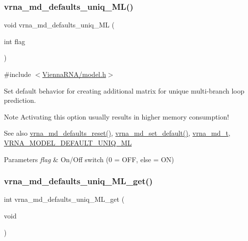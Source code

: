 \subsubsection{\texorpdfstring{vrna\+\_\+md\+\_\+defaults\+\_\+uniq\+\_\+\+M\+L()}{vrna\_md\_defaults\_uniq\_ML()}}
{\footnotesize\ttfamily void vrna\+\_\+md\+\_\+defaults\+\_\+uniq\+\_\+\+ML (\begin{DoxyParamCaption}\item[{int}]{flag }\end{DoxyParamCaption})}



{\ttfamily \#include $<$\hyperlink{model_8h}{Vienna\+R\+N\+A/model.\+h}$>$}



Set default behavior for creating additional matrix for unique multi-\/branch loop prediction. 

\begin{DoxyNote}{Note}
Activating this option usually results in higher memory consumption! 
\end{DoxyNote}
\begin{DoxySeeAlso}{See also}
\hyperlink{group__model__details_ga70834424cf804d149937de89f80ceb45}{vrna\+\_\+md\+\_\+defaults\+\_\+reset()}, \hyperlink{group__model__details_ga8ac6ff84936282436f822644bf841f66}{vrna\+\_\+md\+\_\+set\+\_\+default()}, \hyperlink{group__model__details_ga1f8a10e12a0a1915f2a4eff0b28ea17c}{vrna\+\_\+md\+\_\+t}, \hyperlink{group__model__details_ga63f6006a02ba2d89148441f406c309e7}{V\+R\+N\+A\+\_\+\+M\+O\+D\+E\+L\+\_\+\+D\+E\+F\+A\+U\+L\+T\+\_\+\+U\+N\+I\+Q\+\_\+\+ML} 
\end{DoxySeeAlso}

\begin{DoxyParams}{Parameters}
{\em flag} & On/\+Off switch (0 = O\+FF, else = ON) \\
\hline
\end{DoxyParams}
\mbox{\label{group__model__details_gab48e70fd024bf838404bcbcca0c874a0}} 
\subsubsection{\texorpdfstring{vrna\+\_\+md\+\_\+defaults\+\_\+uniq\+\_\+\+M\+L\+\_\+get()}{vrna\_md\_defaults\_uniq\_ML\_get()}}
{\footnotesize\ttfamily int vrna\+\_\+md\+\_\+defaults\+\_\+uniq\+\_\+\+M\+L\+\_\+get (\begin{DoxyParamCaption}\item[{void}]{ }\end{DoxyParamCaption})}



